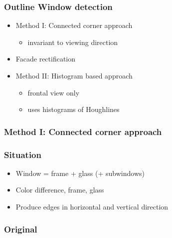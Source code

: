\documentclass{beamer}
\begin{document}
\frame
{
	\frametitle{Outline Window detection}
	\begin{itemize}
	\item Method I: Connected corner approach 
		\begin{itemize}
		\item invariant to viewing direction
		\end{itemize}
	\item Facade rectification 
	\item Method II: Histogram based approach
		\begin{itemize}
		\item frontal view only
		\item uses histograms of Houghlines
		\end{itemize}
	\end{itemize}
}

\frame
{
	\frametitle{Method I: Connected corner approach}
}


\frame
{
	\frametitle{Situation}
	\begin{itemize}
	\item <+-| alert@+> Window = frame + glass (+ subwindows)
	\item <+-| alert@+> Color difference, frame, glass
	\item <+-| alert@+> Produce edges in horizontal and vertical direction
	\end{itemize}
}

\frame
{
	\frametitle{Original}
}
\end{document}
